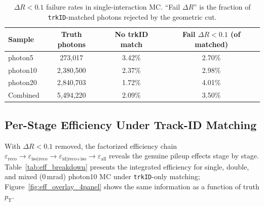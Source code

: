\documentclass[11pt,a4paper]{article}
\newcommand{\pT}{\ensuremath{p_{\text{T}}}\xspace}
\newcommand{\DR}{\ensuremath{\Delta R}\xspace}
\begin{document}
\begin{table}[H]
    \centering
    \caption{$\DR<0.1$ failure rates in single-interaction MC.
      ``Fail $\DR$'' is the fraction of \texttt{trkID}-matched photons
      rejected by the geometric cut.}
    \label{tab:dr_single}
    \begin{tabular}{lccc}
        \toprule
        Sample & Truth photons & No trkID match & Fail $\DR<0.1$ (of matched) \\
        \midrule
        photon5  & 273{,}017     & 3.42\% & 2.70\% \\
        photon10 & 2{,}380{,}500 & 2.37\% & 2.98\% \\
        photon20 & 2{,}840{,}703 & 1.72\% & 4.01\% \\
        \midrule
        Combined & 5{,}494{,}220 & 2.09\% & 3.50\% \\
        \bottomrule
    \end{tabular}
\end{table}

\subsection{Per-Stage Efficiency Under Track-ID Matching}
\label{subsec:per_stage_eff}

With $\DR<0.1$ removed, the factorized efficiency chain
$\varepsilon_{\text{reco}} \to \varepsilon_{\text{iso}|\text{reco}} \to
\varepsilon_{\text{id}|\text{reco+iso}} \to \varepsilon_{\text{all}}$
reveals the genuine pileup effects stage by stage.
Table~\ref{tab:eff_breakdown} presents the integrated efficiency for
single, double, and mixed (0\,mrad) photon10 MC under
\texttt{trkID}-only matching; Figure~\ref{fig:eff_overlay_4panel}
shows the same information as a function of truth \pT.
\end{document}
